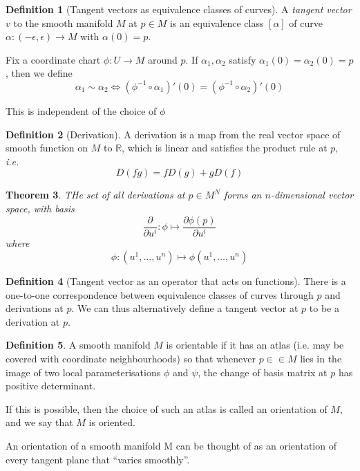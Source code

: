 \documentclass[10pt, oneside, reqno]{amsart}
\newcommand{\R}{\mathbb{R}}
\theoremstyle{plain}%
\newtheorem{thm}{Theorem}[section]
\theoremstyle{definition}
\newtheorem{defn}[thm]{Definition}
\theoremstyle{remark}
\begin{document}
\begin{defn}[Tangent vectors as equivalence classes of curves]
	A \emph{tangent vector} $v$ to the smooth manifold $M$ at $p \in M$ is an equivalence class $[\alpha]$ of curve $\alpha: (-\epsilon, \epsilon) \rightarrow M$ with $\alpha(0) = p$. 
	
	Fix a coordinate chart $\phi: U \rightarrow M$ around $p$.  If $\alpha_1, \alpha_2$ satisfy $\alpha_1(0) = \alpha_2(0) = p$, then we define \[
		\alpha_1 \sim \alpha_2 \Leftrightarrow (\phi^{-1} \circ \alpha_1)'(0) = (\phi^{-1} \circ \alpha_2)'(0)
	\]
	
	This is independent of the choice of $\phi$
\end{defn}

\begin{defn}[Derivation]
	A derivation is a map from the real vector space of smooth function on $M$ to $\R$, which is linear and satisfies the product rule at $p$, \emph{i.e.} \[
		D(fg) = fD(g) + gD(f)
 	\]
\end{defn}

\begin{thm}
	THe set of all derivations at $p \in M^N$ forms an $n$-dimensional vector space, with basis \[
		\frac{\partial}{\partial u^i} : \phi \mapsto \frac{\partial \phi(p)}{\partial u^i}
	\]
	where \[
		\phi :(u^1,\dots, u^n) \mapsto \phi(u^1,\dots,u^n)
	\]
\end{thm}

\begin{defn}[Tangent vector as an operator that acts on functions]
	There is a one-to-one correspondence between equivalence classes of curves through $p$ and derivations at $p$.  We can thus alternatively define a tangent vector at $p$ to be a derivation at $p$.  
\end{defn}

\begin{defn}
	A smooth manifold $M$ is orientable if it has an atlas (i.e. may be covered with coordinate neighbourhoods) so that whenever $p ∈\in M$ lies in the image of two local parameterisations $\phi$ and $\psi$, the change of basis matrix at $p$ has positive determinant.
	
	If this is possible, then the choice of such an atlas is called an orientation of $M$, and we say that $M$ is oriented.
	
	An orientation of a smooth manifold M can be thought of as an orientation of every tangent plane that “varies smoothly”.
\end{defn}
\end{document}
